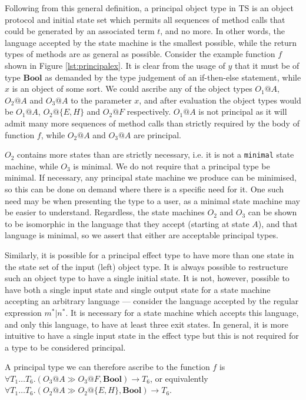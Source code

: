 \documentclass[preprint]{sigplanconf}
\newcommand{\figref}[1]{Figure \ref{#1}}
\newcommand{\boolt}{\mathbf{Bool}}
\begin{document}
Following from this general definition, a principal object type in TS 
is an object protocol and initial state set which permits all sequences of 
method calls that could be generated by an associated term $t$, and no more. 
In other words,
the language accepted by the state machine is the smallest possible, while
the return types of methods are as general as possible. Consider the example
function $f$ shown in \figref{lst:principalex}. It is clear from the usage
of $y$ that it must be of type $\boolt$ as demanded by the type judgement
of an if-then-else statement, while $x$ is an object of some sort.
We could ascribe any of the object types $O_1@A$, $O_2@A$ and $O_3@A$ to the parameter 
$x$, and after evaluation the object types would be $O_1@A$, $O_2@\{E,H\}$
and $O_2@F$ respectively.
$O_1@A$ is not principal as it will admit many more sequences of method calls 
than strictly required by the body of function $f$, while $O_2@A$ and $O_3@A$ 
are principal.

$O_2$ contains more states than are strictly necessary, i.e. it
is not a {\tt minimal} state machine, while $O_3$ is minimal.
We do not require that a principal type be minimal. If necessary, any
principal state machine we produce can be minimised, so this can be done
on demand where there is a specific need for it. One such need may be when
presenting the type to a user, as a minimal state machine may be easier to 
understand. Regardless, the state machines $O_2$ and $O_3$ can be shown to be 
isomorphic in the language that they accept (starting at state $A$), and that 
language is minimal, so we assert that either are acceptable principal types.

Similarly, it is possible for a principal effect type to have more than
one state in the state set of the input (left) object type. It is
always possible to restructure such an object type to have a single initial
state. It is not, however, possible to have both a single input state and
single output state for a state machine accepting an arbitrary language --- 
consider the language accepted by the regular expression $m^* | n^*$. It is 
necessary for a state machine which accepts this language, and only this 
language, to
have at least three exit states. In general, it is more intuitive to have
a single input state in the effect type but this is not required for a
type to be considered principal.

A principal type we can therefore ascribe to the function $f$
is $\forall T_1 \ldots T_6 . (O_3@A \gg O_3@F, \boolt) \rightarrow T_6$, 
or equivalently 
$\forall T_1 \ldots T_6 . (O_2@A \gg O_2@\{E,H\}, \boolt) \rightarrow T_6$.
\end{document}
